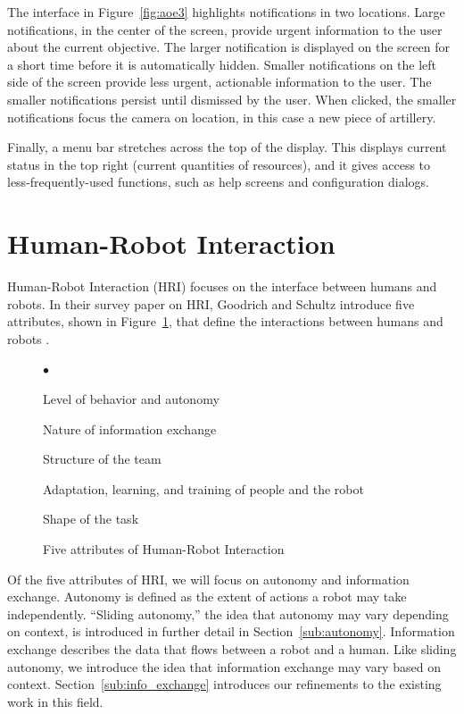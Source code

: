 The interface in Figure~\ref{fig:aoe3} highlights notifications in two locations. Large notifications, in the center of the screen, provide urgent information to the user about the current objective. The larger notification is displayed on the screen for a short time before it is automatically hidden. Smaller notifications on the left side of the screen provide less urgent, actionable information to the user. The smaller notifications persist until dismissed by the user. When clicked, the smaller notifications focus the camera on location, in this case a new piece of artillery.

Finally, a menu bar stretches across the top of the display. This displays current status in the top right (current quantities of resources), and it gives access to less-frequently-used functions, such as help screens and configuration dialogs.



\section{Human-Robot Interaction}
\label{sec:hri}
Human-Robot Interaction (HRI) focuses on the interface between humans and robots. In their survey paper on HRI, Goodrich and Schultz introduce five attributes, shown in Figure~\ref{fig:five-attributes}, that define the interactions between humans and robots \cite{Goodrich_Survey}.

\begin{figure}[ht]
	\makebox[\textwidth]{\hrulefill}
	\begin{list}{$\bullet$}
		\item Level of behavior and autonomy
		\item \item Nature of information exchange %
		\item Structure of the team
		\item Adaptation, learning, and training of people and the robot
		\item Shape of the task
	\end{list}
	\makebox[\textwidth]{\hrulefill}
	\caption{Five attributes of Human-Robot Interaction \label{fig:five-attributes}}
\end{figure}

Of the five attributes of HRI, we will focus on autonomy and information exchange. Autonomy is defined as the extent of actions a robot may take independently. ``Sliding autonomy,'' the idea that autonomy may vary depending on context, is introduced in further detail in Section~\ref{sub:autonomy}. Information exchange describes the data that flows between a robot and a human. Like sliding autonomy, we introduce the idea that information exchange may vary based on context. Section~\ref{sub:info_exchange} introduces our refinements to the existing work in this field.

